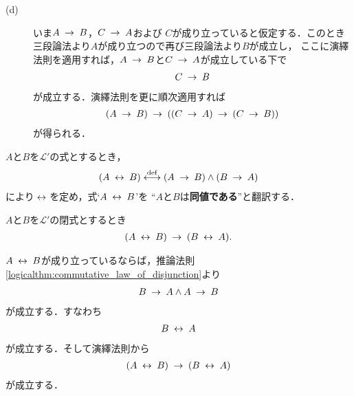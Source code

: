 \begin{prf}
\begin{description}
			\item[(d)]
				いま$A \rarrow B$，$C \rarrow A$および
				$C$が成り立っていると仮定する．このとき三段論法より$A$が成り立つので再び三段論法より$B$が成立し，
				ここに演繹法則を適用すれば，$A \rarrow B$と$C \rarrow A$が成立している下で
				\begin{align}
					C \rarrow B
				\end{align}
				が成立する．演繹法則を更に順次適用すれば
				\begin{align}
					(A \rarrow B) \rarrow ( (C \rarrow A) \rarrow (C \rarrow B) )
				\end{align}
				が得られる．
				\QED
		\end{description}
	\end{prf}
	
	$A$と$B$を$\mathcal{L}'$の式とするとき，
	\begin{align}
		(A \lrarrow B) \defarrow
		(A \rarrow B) \wedge (B \rarrow A)
	\end{align}
	により$\lrarrow$を定め，式`$A \lrarrow B$'を
	``$A$と$B$は{\bf 同値である}''と翻訳する．
	
	\begin{screen}
		\begin{logicalthm}[同値記号の可換律]\label{logicalthm:commutative_law_of_equivalence}
			$A$と$B$を$\mathcal{L}'$の閉式とするとき
			\begin{align}
				(A \lrarrow B) \rarrow (B \lrarrow A).
			\end{align}
		\end{logicalthm}
	\end{screen}
	
	\begin{sketch}
		$A \lrarrow B$が成り立っているならば，推論法則\ref{logicalthm:commutative_law_of_disjunction}より
		\begin{align}
			B \rarrow A \wedge A \rarrow B
		\end{align}
		が成立する．すなわち
		\begin{align}
			B \lrarrow A
		\end{align}
		が成立する．そして演繹法則から
		\begin{align}
			(A \lrarrow B) \rarrow (B \lrarrow A)
		\end{align}
		が成立する．
		\QED
	\end{sketch}
	

